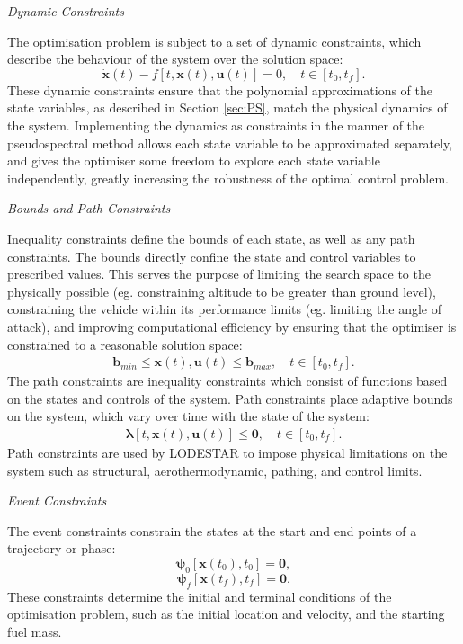 \noindent \textit{Dynamic Constraints}

\noindent 
The optimisation problem is subject to a set of dynamic constraints, which describe the behaviour of the system over the solution space:
\begin{equation} \label{eq:state}
\dot{\textbf{x}}(t) - f[t,\textbf{x}(t),\textbf{u}(t)] = 0, \quad t \in [t_0,t_f].
\end{equation}
These dynamic constraints ensure that the polynomial approximations of the state variables, as described in Section \ref{sec:PS}, match the physical dynamics of the system. Implementing the dynamics as constraints in the manner of the pseudospectral method allows each state variable to be approximated separately, and gives the optimiser some freedom to explore each state variable independently, greatly increasing the robustness of the optimal control problem.



\noindent \textit{Bounds and Path Constraints}

\noindent Inequality constraints define the bounds of each state, as well as any path constraints.
The bounds directly confine the state and control variables to prescribed values. This serves the purpose of limiting the search space to the physically possible (eg. constraining altitude to be greater than ground level), constraining the vehicle within its performance limits (eg. limiting the angle of attack), and improving computational efficiency by ensuring that the optimiser is constrained to a reasonable solution space:
\begin{eqnarray}
\mathbf{b}_{min} \leq \textbf{x}(t),\textbf{u}(t) \leq \mathbf{b}_{max}, \quad t \in [t_0,t_f].
\end{eqnarray}
The path constraints are inequality constraints which consist of functions based on the states and controls of the system. Path constraints place adaptive bounds on the system, which vary over time with the state of the system:
\begin{eqnarray}
\mathbf{\lambda}[t,\textbf{x}(t),\textbf{u}(t)] \leq \textbf{0}, \quad t \in [t_0,t_f].
\end{eqnarray}
Path constraints are used by LODESTAR to impose physical limitations on the system such as structural, aerothermodynamic, pathing, and control limits.

\noindent \textit{Event Constraints}

\noindent The event constraints constrain the states at the start and end points of a trajectory or phase:
\begin{equation}
\mathbf{\psi}_0[\textbf{x}(t_{0}), t_{0}] = \textbf{0},
\end{equation}
\begin{equation} \label{eq:2}
\mathbf{\psi}_f[\textbf{x}(t_{f}), t_{f}] = \textbf{0}.
\end{equation}
These constraints determine the initial and terminal conditions of the optimisation problem, such as the initial location and velocity, and the starting fuel mass.


